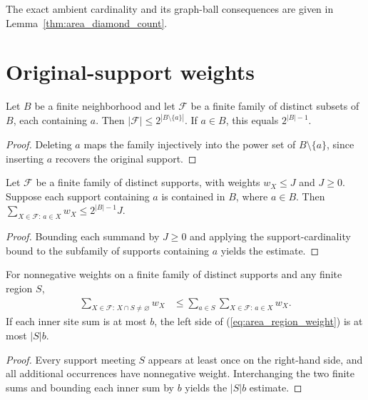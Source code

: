 The exact ambient cardinality and its graph-ball consequences are given in
Lemma~\ref{thm:area_diamond_count}.

\section{Original-support weights}

\begin{lemma}
    \label{thm:area_support_count}
    \leanok
    Let $B$ be a finite neighborhood and let $\mathcal F$ be a finite family of
    distinct subsets of $B$, each containing $a$. Then
    $|\mathcal F|\le2^{|B\setminus\{a\}|}$. If $a\in B$, this equals
    $2^{|B|-1}$.
\end{lemma}
\begin{proof}
    \leanok
    Deleting $a$ maps the family injectively into the power set of
    $B\setminus\{a\}$, since inserting $a$ recovers the original support.
\end{proof}

\begin{lemma}
    \label{thm:area_site_weight}
    \leanok
    Let $\mathcal F$ be a finite family of distinct supports, with weights
    $w_X\le J$ and $J\ge0$. Suppose each support containing $a$ is contained
    in $B$, where $a\in B$. Then
    $\sum_{X\in\mathcal F:\,a\in X}w_X\le2^{|B|-1}J$.
\end{lemma}
\begin{proof}
    \leanok
    Bounding each summand by $J\ge0$ and applying the support-cardinality
    bound to the subfamily of supports containing $a$ yields the estimate.
\end{proof}

\begin{lemma}
    \label{thm:area_region_weight}
    \leanok
    For nonnegative weights on a finite family of distinct supports and
    any finite region $S$,
    \begin{align}
        \sum_{X\in\mathcal F:\,X\cap S\ne\varnothing}w_X
         & \le\sum_{a\in S}\sum_{X\in\mathcal F:\,a\in X}w_X.
        \label{eq:area_region_weight}
    \end{align}
    If each inner site sum is at most $b$, the left side of
    (\ref{eq:area_region_weight}) is at most $|S|b$.
\end{lemma}
\begin{proof}
    \leanok
    Every support meeting $S$ appears at least once on the right-hand
    side, and all additional occurrences have nonnegative weight.
    Interchanging the two finite sums and bounding each inner sum by $b$
    yields the $|S|b$ estimate.
\end{proof}

